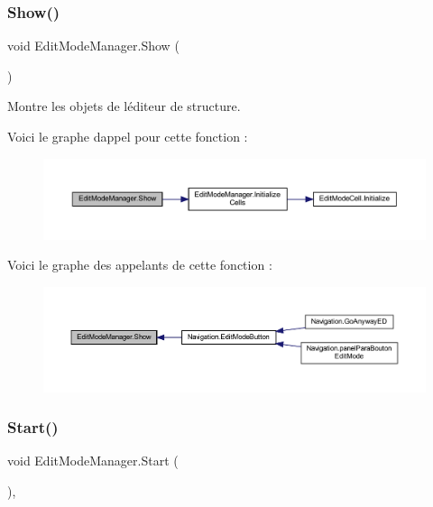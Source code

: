 \subsubsection{\texorpdfstring{Show()}{Show()}}
{\footnotesize\ttfamily void Edit\+Mode\+Manager.\+Show (\begin{DoxyParamCaption}{ }\end{DoxyParamCaption})\hspace{0.3cm}{\ttfamily [inline]}}



Montre les objets de l\textquotesingle{}éditeur de structure. 

Voici le graphe d\textquotesingle{}appel pour cette fonction \+:
\nopagebreak
\begin{figure}[H]
\begin{center}
\leavevmode
\includegraphics[width=350pt]{class_edit_mode_manager_acf80baac30f6611bcb1bf97b61ffc1ca_cgraph}
\end{center}
\end{figure}
Voici le graphe des appelants de cette fonction \+:
\nopagebreak
\begin{figure}[H]
\begin{center}
\leavevmode
\includegraphics[width=350pt]{class_edit_mode_manager_acf80baac30f6611bcb1bf97b61ffc1ca_icgraph}
\end{center}
\end{figure}
\mbox{\label{class_edit_mode_manager_a4f5385630cfd8a65e1aac37f79b4f8d3}} 
\subsubsection{\texorpdfstring{Start()}{Start()}}
{\footnotesize\ttfamily void Edit\+Mode\+Manager.\+Start (\begin{DoxyParamCaption}{ }\end{DoxyParamCaption})\hspace{0.3cm}{\ttfamily [inline]}, {\ttfamily [private]}}







